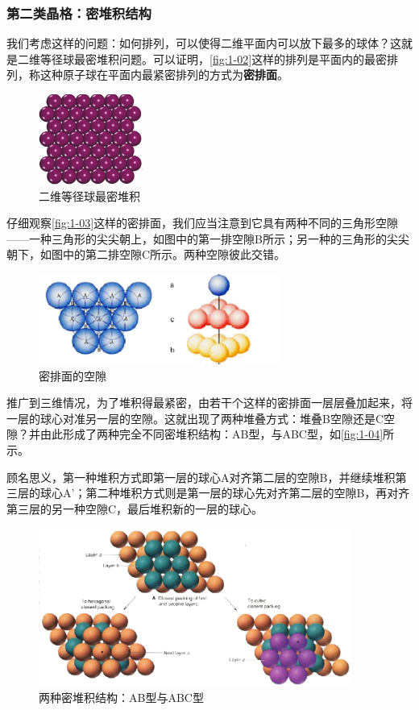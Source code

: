 \subsubsection{第二类晶格：密堆积结构}
    我们考虑这样的问题：如何排列，可以使得二维平面内可以放下最多的球体？这就是二维等径球最密堆积问题。可以证明，\autoref{fig:1-02}这样的排列是平面内的最密排列，称这种原子球在平面内最紧密排列的方式为\textbf{密排面}。

    \begin{figure}[!htbp]
        \centering
        \includegraphics[height=8em, keepaspectratio=true]{pic/1-09}
        \caption{二维等径球最密堆积}
        \label{fig:1-02}
    \end{figure}

    仔细观察\autoref{fig:1-03}这样的密排面，我们应当注意到它具有两种不同的三角形空隙——一种三角形的尖尖朝上，如图中的第一排空隙B所示；另一种的三角形的尖尖朝下，如图中的第二排空隙C所示。两种空隙彼此交错。

    \begin{figure}[!htbp]
        \centering
        \includegraphics[height=8em, keepaspectratio=true]{pic/1-10}
        \caption{密排面的空隙}
        \label{fig:1-03}
    \end{figure}

    推广到三维情况，为了堆积得最紧密，由若干个这样的密排面一层层叠加起来，将一层的球心对准另一层的空隙。这就出现了两种堆叠方式：堆叠B空隙还是C空隙？并由此形成了两种完全不同密堆积结构：AB型，与ABC型，如\autoref{fig:1-04}所示。
    
    顾名思义，第一种堆积方式即第一层的球心A对齐第二层的空隙B，并继续堆积第三层的球心A'；第二种堆积方式则是第一层的球心先对齐第二层的空隙B，再对齐第三层的另一种空隙C，最后堆积新的一层的球心。
    
    \begin{figure}[!htbp]
        \centering
        \includegraphics[height=14em, keepaspectratio=true]{pic/1-11}
        \caption{两种密堆积结构：AB型与ABC型}
        \label{fig:1-04}
    \end{figure}

